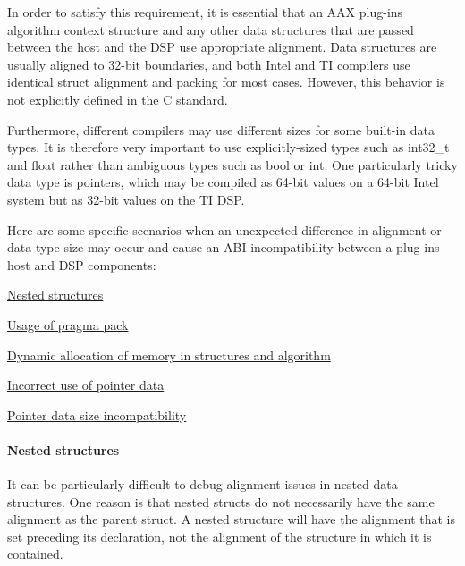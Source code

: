 In order to satisfy this requirement, it is essential that an A\+A\+X plug-\/in\textquotesingle{}s algorithm context structure and any other data structures that are passed between the host and the D\+S\+P use appropriate alignment. Data structures are usually aligned to 32-\/bit boundaries, and both Intel and T\+I compilers use identical struct alignment and packing for most cases. However, this behavior is not explicitly defined in the C standard.

Furthermore, different compilers may use different sizes for some built-\/in data types. It is therefore very important to use explicitly-\/sized types such as {\ttfamily int32\+\_\+t} and {\ttfamily float} rather than ambiguous types such as {\ttfamily bool} or {\ttfamily int}. One particularly tricky data type is pointers, which may be compiled as 64-\/bit values on a 64-\/bit Intel system but as 32-\/bit values on the T\+I D\+S\+P.

Here are some specific scenarios when an unexpected difference in alignment or data type size may occur and cause an A\+B\+I incompatibility between a plug-\/in\textquotesingle{}s host and D\+S\+P components\+:


\begin{DoxyItemize}
\item \hyperlink{a00362_subsubsection__nested_structures}{Nested structures}  
\item \hyperlink{a00362_subsubsection__pragma_pack}{Usage of pragma pack}  
\item \hyperlink{a00362_subsubsection__dynamic_allocation_of_memory}{Dynamic allocation of memory in structures and algorithm}  
\item \hyperlink{a00362_subsubsection__incorrect_use_of_pointer_data}{Incorrect use of pointer data}  
\item \hyperlink{a00362_subsubsection__pointer_data_size_incompatibility}{Pointer data size incompatibility}  
\end{DoxyItemize}

\hypertarget{a00362_subsubsection__nested_structures}{}\paragraph{Nested structures}\label{a00362_subsubsection__nested_structures}
It can be particularly difficult to debug alignment issues in nested data structures. One reason is that nested structs do not necessarily have the same alignment as the parent struct. A nested structure will have the alignment that is set preceding its declaration, not the alignment of the structure in which it is contained.

